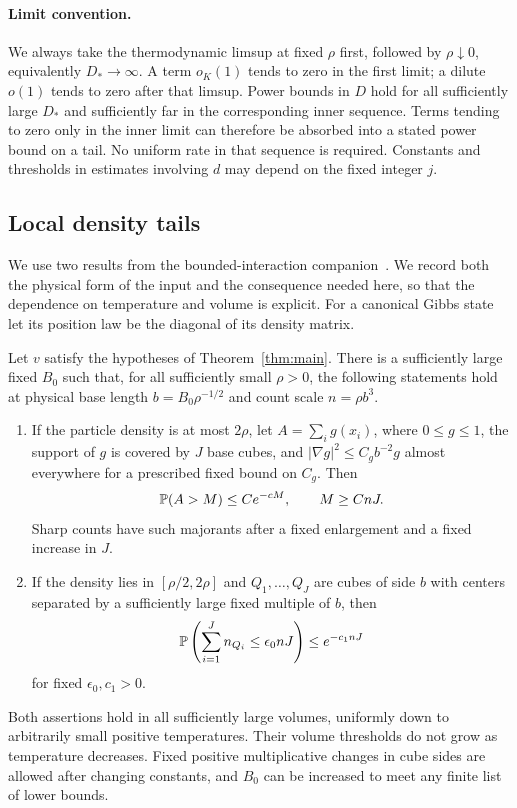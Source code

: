 \paragraph{Limit convention.}
We always take the thermodynamic limsup at fixed $\rho$ first, followed
by $\rho\downarrow0$, equivalently $D_*\to\infty$. A term $o_K(1)$
tends to zero in the first limit; a dilute $o(1)$ tends to zero after
that limsup. Power bounds in $D$ hold for all sufficiently large $D_*$
and sufficiently far in the corresponding inner sequence. Terms tending
to zero only in the inner limit can therefore be absorbed into a stated
power bound on a tail. No uniform rate in that sequence is required.
Constants and thresholds in estimates involving $d$ may depend on the
fixed integer $j$.

\subsection{Local density tails}

We use two results from the bounded-interaction companion~\cite{C}.
We record both the physical form of the input and the consequence needed
here, so that the dependence on temperature and volume is explicit.
For a canonical Gibbs state let its position law be the diagonal of its
density matrix.

\begin{proposition}\label{prop:density-input}
Let $v$ satisfy the hypotheses of Theorem~\ref{thm:main}. There is a
sufficiently large fixed $B_0$ such that, for all sufficiently small
$\rho>0$, the following statements hold at physical base length
$b=B_0\rho^{-1/2}$ and count scale $n=\rho b^3$.
\begin{enumerate}[label=\textup{(\roman*)}]
\item If the particle density is at most $2\rho$, let
$A=\sum_i g(x_i)$, where $0\le g\le1$, the support of $g$ is covered
by $J$ base cubes, and $|\nabla g|^2\le C_gb^{-2}g$ almost everywhere
for a prescribed fixed bound on $C_g$. Then
\[
 \mathbb P(A>M)\le C e^{-cM},\qquad M\ge CnJ.
\]
Sharp counts have such majorants after a fixed enlargement and a fixed
increase in $J$.
\item If the density lies in $[\rho/2,2\rho]$ and $Q_1,\ldots,Q_J$
are cubes of side $b$ with centers separated by a sufficiently large
fixed multiple of $b$, then
\[
 \mathbb P\left(\sum_{i=1}^J n_{Q_i}\le\epsilon_0 nJ\right)
 \le e^{-c_1 nJ}
\]
for fixed $\epsilon_0,c_1>0$.
\end{enumerate}
Both assertions hold in all sufficiently large volumes, uniformly down
to arbitrarily small positive temperatures. Their volume thresholds do
not grow as temperature decreases. Fixed positive multiplicative changes
in cube sides are allowed after changing constants, and $B_0$ can be
increased to meet any finite list of lower bounds.
\end{proposition}


